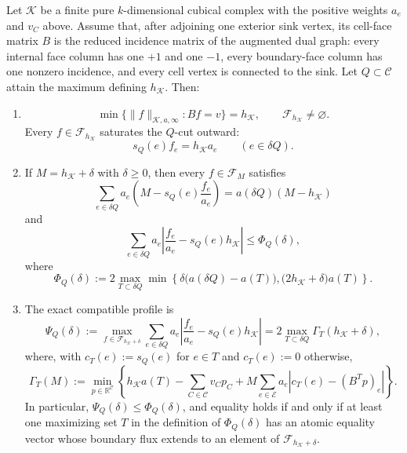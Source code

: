 \begin{theorem}
\label{thm:exact-cubical-patching}
Let $\mathcal K$ be a finite pure $k$-dimensional cubical complex with the
positive weights $a_e$ and $v_C$ above. Assume that, after adjoining one
exterior sink vertex, its cell-face matrix $B$ is the reduced incidence matrix
of the augmented dual graph: every internal face column has one $+1$ and one
$-1$, every boundary-face column has one nonzero incidence, and every cell
vertex is connected to the sink. Let $Q\subset\mathcal C$ attain the maximum
defining $h_{\mathcal K}$. Then:

\begin{enumerate}
\item
\[
 \min\{\|f\|_{\mathcal K,a,\infty}:Bf=v\}=h_{\mathcal K},
 \qquad
 \mathcal F_{h_{\mathcal K}}\ne\varnothing.
\]
Every $f\in\mathcal F_{h_{\mathcal K}}$ saturates the $Q$-cut outward:
\[
 s_Q(e)f_e=h_{\mathcal K}a_e
 \qquad(e\in\delta Q).
\]

\item If $M=h_{\mathcal K}+\delta$ with $\delta\ge0$, then every
 $f\in\mathcal F_M$ satisfies
\begin{equation}
\label{eq:patched-deficit-identity}
 \sum_{e\in\delta Q}a_e
 \left(M-s_Q(e)\frac{f_e}{a_e}\right)
 =a(\delta Q)(M-h_{\mathcal K})
\end{equation}
and
\begin{equation}
\label{eq:patched-atomic-upper-bound}
 \sum_{e\in\delta Q}a_e
 \left|\frac{f_e}{a_e}-s_Q(e)h_{\mathcal K}\right|
 \le
 \Phi_Q(\delta),
\end{equation}
where
\[
 \Phi_Q(\delta):=2\max_{T\subset\delta Q}
 \min\left\{
 \delta\bigl(a(\delta Q)-a(T)\bigr),
 \bigl(2h_{\mathcal K}+\delta\bigr)a(T)
 \right\}.
\]

\item The exact compatible profile is
\begin{equation}
\label{eq:patched-exact-profile}
 \Psi_Q(\delta):=
 \max_{f\in\mathcal F_{h_{\mathcal K}+\delta}}
 \sum_{e\in\delta Q}a_e
 \left|\frac{f_e}{a_e}-s_Q(e)h_{\mathcal K}\right|
 =2\max_{T\subset\delta Q}\Gamma_T(h_{\mathcal K}+\delta),
\end{equation}
where, with $c_T(e):=s_Q(e)$ for $e\in T$ and $c_T(e):=0$ otherwise,
\[
 \Gamma_T(M):=
 \min_{p\in\mathbb R^{\mathcal C}}
 \left\{
 h_{\mathcal K}a(T)-\sum_{C\in\mathcal C}v_Cp_C
 +M\sum_{e\in\mathcal E}a_e
 \left|c_T(e)-(B^Tp)_e\right|
 \right\}.
\]
In particular, $\Psi_Q(\delta)\le\Phi_Q(\delta)$, and equality holds if and
only if at least one maximizing set $T$ in the definition of $\Phi_Q(\delta)$
has an atomic equality vector whose boundary flux extends to an element of
$\mathcal F_{h_{\mathcal K}+\delta}$.


\end{enumerate}
\end{theorem}
